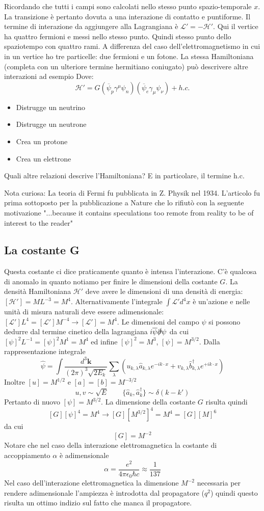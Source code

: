 Ricordando che tutti i campi sono calcolati nello stesso punto spazio-temporale $x$. La transizione è pertanto dovuta a una interazione di contatto e puntiforme. Il termine di interazione da aggiungere alla Lagrangiana è $\mathcal{L}'=-\mathcal{H}'$. Qui il vertice ha quattro fermioni e messi nello stesso punto. Quindi stesso punto dello spaziotempo con quattro rami. A differenza del caso dell'elettromagnetismo in cui in un vertice ho tre particelle: due fermioni e un fotone.
La stessa Hamiltoniana (completa con un ulteriore termine hermitiano coniugato) può descrivere altre interazioni ad esempio
Dove:
$$
\mathcal{H}' = G (\overline{\psi}_p \gamma^\mu \psi_n) (\overline{\psi}_e \gamma_\mu \psi_\nu) + h.c.
$$
\begin{itemize}
    \item Distrugge un neutrino
    \item Distrugge un neutrone
    \item Crea un protone
    \item Crea un elettrone
\end{itemize}
Quali altre relazioni descrive l'Hamiltoniana? E in particolare, il termine h.c.

Nota curiosa: La teoria di Fermi fu pubblicata in Z. Physik nel 1934. L'articolo fu prima sottoposto per la pubblicazione a Nature che lo rifiutò con la seguente motivazione "...because it contains speculations too remote from reality to be of interest to the reader"
\subsection{La costante G}
Questa costante ci dice praticamente quanto è intensa l'interazione. C'è qualcosa di anomalo in quanto notiamo per finire le dimensioni della costante $G$. La densità Hamiltoniana $\mathcal{H}'$ deve avere le dimensioni di una densità di energia: $[\mathcal{H}']=ML^{-3}=M^4$. Alternativamente l'integrale $\int\mathcal{L'}d^4x$ è un'azione e nelle unità di misura naturali deve essere adimensionale: $[\mathcal{L}']L^4=[\mathcal{L}']M^{-4}\to[\mathcal{L}']=M^4$. Le dimensioni del campo $\psi$ si possono dedurre dal termine cinetico della lagrangiana $i\overline{\psi}\slashed{\partial}\psi$ da cui $[\psi]^2L^{-1}=[\psi]^2M^1=M^4$ ed infine $[\psi]^2=M^3$, $[\psi]=M^{3/2}$. Dalla rappresentazione integrale
$$
\hat{\psi} = \int \frac{d^3\mathbf{k}}{(2\pi)^3 \sqrt{2E_k}} \sum_\lambda (u_{k,\lambda} \hat{a}_{k,\lambda} e^{-ik\cdot x} + v_{k,\lambda} \hat{b}_{k,\lambda}^\dagger e^{+ik\cdot x})
$$
Inoltre $[u]=M^{1/2}$ e $[a]=[b]=M^{-3/2}$
$$
u,v \sim \sqrt{E} \qquad \{\hat{a}_k, \hat{a}_k^\dagger\} \sim \delta(k-k')
$$
Pertanto di nuovo $[\psi]=M^{3/2}$. La dimensione della costante $G$ risulta quindi 
$$
[G] [\psi]^4 = M^4 \to [G][M^{3/2}]^4 = M^4 = [G][M]^6
$$
da cui 
$$
[G] = M^{-2}
$$
Notare che nel caso della interazione elettromagnetica la costante di accoppiamento $\alpha$ è adimensionale
$$
\alpha = \frac{e^2}{4\pi\epsilon_0 \hbar c} \approx \frac{1}{137}
$$
Nel caso dell'interazione elettromagnetica la dimensione $M^{-2}$ necessaria per rendere adimensionale l'ampiezza è introdotta dal propagatore ($q^2$) quindi questo risulta un ottimo indizio sul fatto che manca il propagatore.
